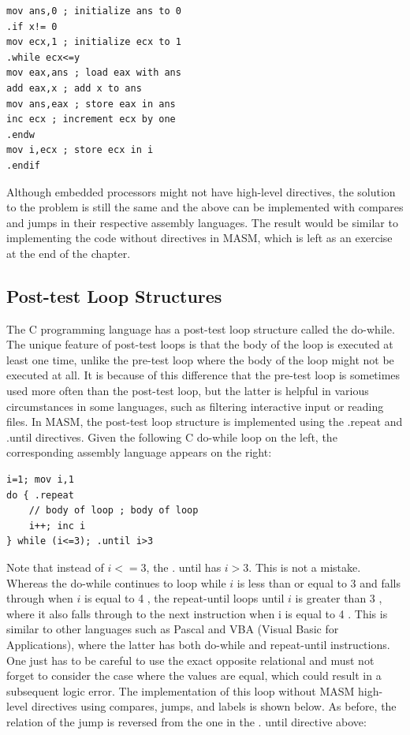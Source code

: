 \documentclass[10pt]{book}
\begin{document}
\begin{verbatim}
mov ans,0 ; initialize ans to 0
.if x!= 0
mov ecx,1 ; initialize ecx to 1
.while ecx<=y
mov eax,ans ; load eax with ans
add eax,x ; add x to ans
mov ans,eax ; store eax in ans
inc ecx ; increment ecx by one
.endw
mov i,ecx ; store ecx in i
.endif
\end{verbatim}

Although embedded processors might not have high-level directives, the solution to the problem is still the same and the above can be implemented with compares and jumps in their respective assembly languages. The result would be similar to implementing the code without directives in MASM, which is left as an exercise at the end of the chapter.

\subsection{Post-test Loop Structures}
The C programming language has a post-test loop structure called the do-while. The unique feature of post-test loops is that the body of the loop is executed at least one time, unlike the pre-test loop where the body of the loop might not be executed at all. It is because of this difference that the pre-test loop is sometimes used more often than the post-test loop, but the latter is helpful in various circumstances in some languages, such as filtering interactive input or reading files. In MASM, the post-test loop structure is implemented using the .repeat and .until directives. Given the following C do-while loop on the left, the corresponding assembly language appears on the right:

\begin{verbatim}
i=1; mov i,1
do { .repeat
    // body of loop ; body of loop
    i++; inc i
} while (i<=3); .until i>3
\end{verbatim}

Note that instead of $i<=3$, the . until has $i>3$. This is not a mistake. Whereas the do-while continues to loop while $i$ is less than or equal to 3 and falls through when $i$ is equal to 4 , the repeat-until loops until $i$ is greater than 3 , where it also falls through to the next instruction when i is equal to 4 . This is similar to other languages such as Pascal and VBA (Visual Basic for Applications), where the latter has both do-while and repeat-until instructions. One just has to be careful to use the exact opposite relational and must not forget to consider the case where the values are equal, which could result in a subsequent logic error. The implementation of this loop without MASM high-level directives using compares, jumps, and labels is shown below. As before, the relation of the jump is reversed from the one in the . until directive above:
\end{document}
